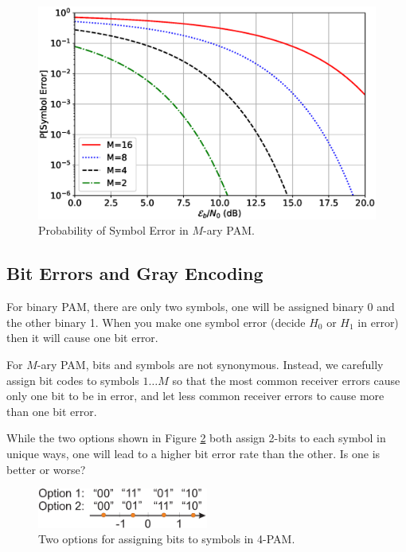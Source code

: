   \begin{figure}[htbp]
    \centerline{\includegraphics[width=\textwidth]{../images/plotPrSymbolErrorMPAM.eps} }
    \caption{Probability of Symbol Error in $M$-ary PAM.}
    \label{F:plotPerrorMaryPAM}
  \end{figure}


\subsection{Bit Errors and Gray Encoding}

For binary PAM, there are only two symbols, one will be assigned
binary 0 and the other binary 1.  When you make one symbol error
(decide $H_0$ or $H_1$ in error) then it will cause one bit error.

For $M$-ary PAM, bits and symbols are not synonymous.  Instead, we
carefully assign bit codes to symbols $1 \ldots M$ so that the most common receiver errors cause only one bit to be in error, and let less common receiver errors to cause more than one bit error.

  While the two options shown
in Figure \ref{F:4AryPAM-BitCodingOptions} both assign 2-bits to
each symbol in unique ways, one will lead to a higher bit error rate
than the other.  Is one is better or worse?
  \begin{figure}[htbp]
    \centerline{\includegraphics[width=0.5\textwidth]{../images/4AryPAM-BitCodingOptions.eps} }
    \caption{Two options for assigning bits to symbols in 4-PAM.}
    \label{F:4AryPAM-BitCodingOptions}
  \end{figure}

